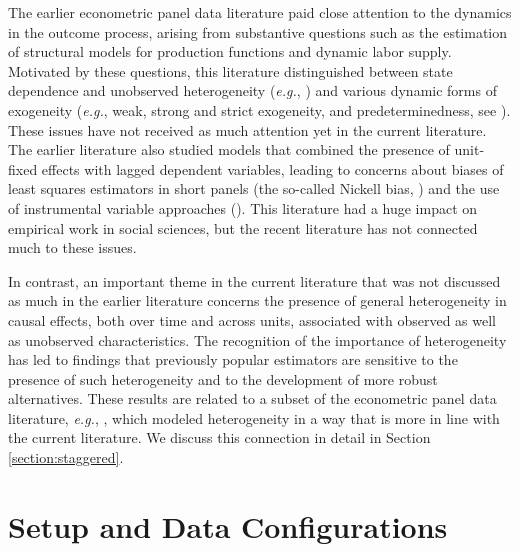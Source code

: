 \documentclass[letterpaper,12pt,leqno]{article}
\begin{document}
The earlier econometric panel data literature paid close attention to the dynamics in the outcome process, arising from substantive questions such as the estimation of structural models for production functions and dynamic labor supply. Motivated by these questions, this literature distinguished between state dependence and unobserved heterogeneity ({\it e.g.}, \citep{heckman1981statistical, chamberlain1984panel}) and various dynamic forms of exogeneity ({\it e.g.}, weak, strong and strict exogeneity, and predeterminedness, see \citep{engle1983exogeneity, arellano1991some}). These issues have not received as much attention yet in the current literature.
The earlier literature also studied models that combined the presence of unit-fixed effects with lagged dependent variables, leading to concerns about biases of least squares estimators in short panels (the so-called Nickell bias, \cite{nickell1981biases}) and the use of instrumental variable approaches
(\citealp{nickell1981biases, arellano1991some, blundell1998initial,hahn2002asymptotically,alvarez2003time}). This literature had a huge impact on empirical work in social sciences, but the recent literature has not connected much to these issues.

In contrast, an important theme in the current literature that was not discussed as much in the earlier literature concerns the presence of general 
heterogeneity in causal effects, both over time and across units, associated with observed as well as unobserved characteristics. The recognition of the importance of heterogeneity has led to findings that previously popular estimators are sensitive to the presence of such heterogeneity and to the development of more robust alternatives. These results are related to a subset of the econometric panel data literature, {\it e.g.}, \citep{chamberlain1992efficiency,arellano2011identifying,graham2012identification,chernozhukov2013average}, which modeled heterogeneity in a way that is more in line with the current literature. We discuss this connection in detail in Section \ref{section:staggered}.

\section{Setup and Data Configurations}\label{section:configurations}
\end{document}
